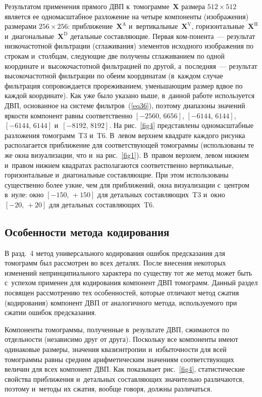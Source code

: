 \begin{multicols}{2}
Результатом применения прямого ДВП к~томограмме~$\mathbf{X}$ размера $512\times512$ 
является ее одномасштабное разложение на четыре компоненты (изоб\-ра\-же\-ния) 
размерами $256\times256$: приближение~$\mathbf {X}^{\mathrm{A}}$ 
и~вертикальные~$\mathbf{X}^{\mathrm{V}}$, горизонтальные~$\mathbf{X}^{\mathrm{H}}$ 
и~диагональные~$\mathbf{X}^{\mathrm{D}}$ детальные составляющие. Первая ком-\linebreak понента~--- 
результат низкочастотной фильтрации (сглаживания) элементов исходного изображения 
по строкам и~столбцам, следующие две получены сглаживанием по одной координате 
и~вы\-со\-ко\-час\-тот\-ной фильтрацией по другой, а~последняя~--- 
результат высокочастотной фильтрации по обеим координатам (в~каждом случае 
фильт\-ра\-ция сопровождается прореживанием, уменьшающим размер вдвое 
по каждой координате). Как уже было указано выше, в~данной работе используется 
ДВП, основанное на системе фильтров~(\ref{eq36}), поэтому диапазоны значений 
яркости компонент равны соответственно  $[-2560,\,6656]$, 
$[-6144,\,6144]$, $[-6144,\,6144]$ и~$[-8192,\,8192]$. На рис.~\ref{fig4} 
представлены одномасштабные разложения томограмм~T3 и~T6. 
В~левом верхнем квадрате каждого рисунка располагается приближение для 
соответствующей томограммы (использованы те же окна визуализации, что и~на 
рис.~\ref{fig1}). В~правом верхнем, левом нижнем и~правом нижнем квадратах 
располагаются соответственно вертикальные, горизонтальные и~диагональные составляющие. 
При этом использованы существенно более узкие, чем для приближений, окна 
визуализации с~центром в~нуле: окно $[-150,\,+150]$ для детальных составляющих~T3 
и~окно $[-20,\,+20]$ для детальных составляющих~T6.

\vspace*{-4pt}


\subsection{Особенности метода кодирования}


В разд.~4 метод универсального кодирования ошибок предсказания для 
томограмм был рас\-смот\-рен во всех деталях. После внесения некоторых изменений 
непринципиального характера по существу тот же метод может быть с~успехом 
применен для кодирования компонент ДВП томограмм. Данный раздел посвящен 
рассмотрению тех особенностей, которые отличают метод сжатия (кодирования) 
компонент ДВП от аналогичного метода, используемого при сжатии ошибок предсказания.

Компоненты томограммы, полученные в~результате ДВП, сжимаются по отдельности 
(независимо друг от друга). Поскольку все компоненты имеют одинаковые размеры, 
значения квазиэнтропии и~избыточности для всей томограммы равны средним арифметическим 
значениям соответствующих величин для всех компонент ДВП. Как 
показывает рис.~\ref{fig4}, статистические свойства приближения и~детальных 
составляющих значительно различаются, поэтому и~методы их сжатия, вообще говоря, 
должны различаться.


\end{multicols}
